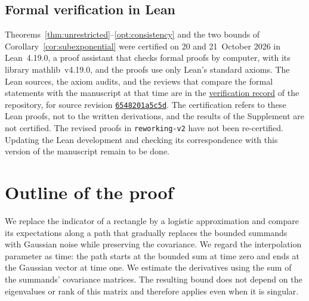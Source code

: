 \documentclass[11pt,letterpaper]{article}
\theoremstyle{remark}
\begin{document}
\subsection{\texorpdfstring{Formal verification in Lean}{Formal verification in Lean}}\label{sec:lean-certification}
\leavevmode Theorems~\ref{thm:unrestricted}--\ref{opt:consistency} and the two bounds of
Corollary~\ref{cor:subexponential} were certified on 20 and 21~October 2026
in Lean~4.19.0, a proof assistant that checks formal proofs by computer,
with its library mathlib~v4.19.0, and the proofs use only Lean's standard
axioms. The Lean sources, the axiom audits, and the reviews that compare the
formal statements with the manuscript at that time are in the
\href{https://github.com/VC2015/HDCLTs/blob/bbf1ab99c733a398c181ca8c9f5a243a41f258c6/verification/2026-10-21-companion-results/README.md}{verification record}
of the repository, for source revision
\href{https://github.com/VC2015/HDCLTs/commit/6548201a5c5d9c132a53f1d504f7ef70346aa782}{\texttt{6548201a5c5d}}.
The certification refers to these Lean proofs, not to the written
derivations, and the results of the Supplement are not certified.
The revised proofs in \texttt{reworking-v2} have not been re-certified.
Updating the Lean development and checking its correspondence with this
version of the manuscript remain to be done.

\section{Outline of the proof}
\label{sec:smoothing}

We replace the indicator of a rectangle by a logistic approximation and
compare its expectations along a path that gradually replaces the bounded
summands with Gaussian noise while preserving the covariance. We regard
the interpolation parameter as time: the path starts at the bounded sum
at time zero and ends at the Gaussian vector at time one. We estimate
the derivatives using the sum of the summands' covariance matrices.
The resulting bound does not depend on the eigenvalues or rank of this
matrix and therefore applies even when it is singular.
\end{document}
